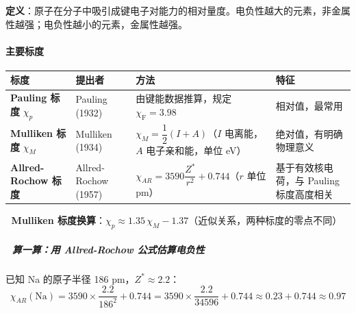 \documentclass[a4paper,11pt]{ctexart}
\newcounter{none}
\begin{document}
\textbf{定义}：原子在分子中吸引成键电子对能力的相对量度。电负性越大的元素，非金属性越强；电负性越小的元素，金属性越强。

\paragraph{主要标度}\label{ux4e3bux8981ux6807ux5ea6}

{\def\LTcaptype{none} %
\begin{longtable}[]{@{}
  >{\raggedright\arraybackslash}p{}
  >{\raggedright\arraybackslash}p{}
  >{\raggedright\arraybackslash}p{}
  >{\raggedright\arraybackslash}p{}@{}}
\toprule\noalign{}
\begin{minipage}[b]{\linewidth}\raggedright
标度
\end{minipage} & \begin{minipage}[b]{\linewidth}\raggedright
提出者
\end{minipage} & \begin{minipage}[b]{\linewidth}\raggedright
方法
\end{minipage} & \begin{minipage}[b]{\linewidth}\raggedright
特征
\end{minipage} \\
\midrule\noalign{}
\endhead
\bottomrule\noalign{}
\endlastfoot
\textbf{Pauling 标度} \(\chi_p\) & Pauling (1932) & 由键能数据推算，规定 \(\chi_{\mathrm{F}}=3.98\) & 相对值，最常用 \\
\textbf{Mulliken 标度} \(\chi_M\) & Mulliken (1934) & \(\chi_M = \dfrac{1}{2}(I + A)\)（\(I\) 电离能，\(A\) 电子亲和能，单位 eV） & 绝对值，有明确物理意义 \\
\textbf{Allred-Rochow 标度} & Allred-Rochow (1957) & \(\chi_{AR} = 3590\dfrac{Z^*}{r^2} + 0.744\)（\(r\) 单位 pm） & 基于有效核电荷，与 Pauling 标度高度相关 \\
\end{longtable}
}

🔗 \textbf{Mulliken 标度换算}：\(\chi_p \approx 1.35\,\chi_M - 1.37\)（近似关系，两种标度的零点不同）

\subparagraph{📝 算一算：用 Allred-Rochow 公式估算电负性}\label{ux7b97ux4e00ux7b97ux7528-allred-rochow-ux516cux5f0fux4f30ux7b97ux7535ux8d1fux6027}

已知 Na 的原子半径 186 pm，\(Z^* \approx 2.2\)：
\[\chi_{AR}(\mathrm{Na}) = 3590 \times \frac{2.2}{186^2} + 0.744 = 3590 \times \frac{2.2}{34596} + 0.744 \approx 0.23 + 0.744 \approx 0.97\]
\end{document}
